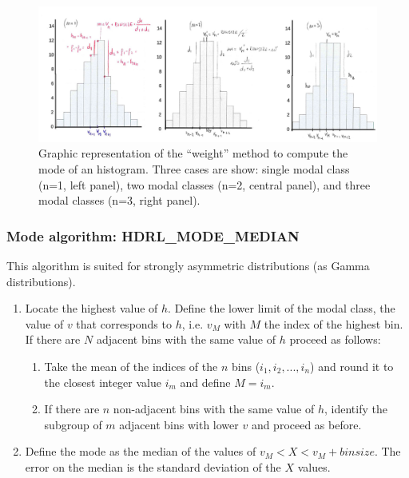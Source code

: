 \begin{figure}
\begin{center}\subfigure
\includegraphics[width=1.05\textwidth]{figures/mode_fig2.jpg}
\caption{Graphic representation of the ``weight'' method to compute
  the mode of an histogram. Three cases are show: single modal class
  (n=1, left panel), two modal classes (n=2, central panel), and three
  modal classes (n=3, right panel).}
\label{fig:weight}
\end{center}
\end{figure}
\subsubsection{Mode algorithm: HDRL\_MODE\_MEDIAN}  
\label{sec:algorithms:robust_mean:mode_median}

This algorithm is suited
for strongly asymmetric distributions (as Gamma distributions).
\begin{enumerate}


\item Locate the highest value of $h$. Define the lower limit of the
  modal class, the value of $v$ that corresponds to $h$, i.e. $v_M$ with $M$ the index of the highest bin. If
  there are $N$ adjacent  bins with the same value of $h$ proceed as follows:
  \begin{enumerate}
    \item Take the mean of the indices of the $n$ bins ($i_1, i_2, ..., i_n$) and round it to the closest integer value $i_m$ and define $M=i_m$.
    \item If there are $n$ non-adjacent bins with the same value of $h$,
      identify the subgroup of $m$ adjacent bins with lower $v$ and
      proceed as before.
    \end{enumerate}

  \item Define the mode as the median of the values of
    $v_M< X <v_M+binsize$. The error on the median is the standard
    deviation of the $X$ values.
\end{enumerate}
